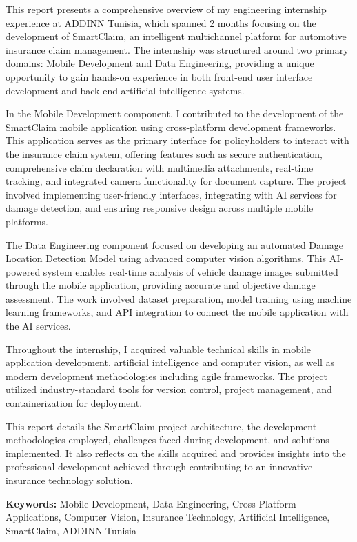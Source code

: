 \documentclass[12pt,a4paper]{report}
\begin{document}
This report presents a comprehensive overview of my engineering internship experience at ADDINN Tunisia, which spanned 2 months focusing on the development of SmartClaim, an intelligent multichannel platform for automotive insurance claim management. The internship was structured around two primary domains: Mobile Development and Data Engineering, providing a unique opportunity to gain hands-on experience in both front-end user interface development and back-end artificial intelligence systems.

In the Mobile Development component, I contributed to the development of the SmartClaim mobile application using cross-platform development frameworks. This application serves as the primary interface for policyholders to interact with the insurance claim system, offering features such as secure authentication, comprehensive claim declaration with multimedia attachments, real-time tracking, and integrated camera functionality for document capture. The project involved implementing user-friendly interfaces, integrating with AI services for damage detection, and ensuring responsive design across multiple mobile platforms.

The Data Engineering component focused on developing an automated Damage Location Detection Model using advanced computer vision algorithms. This AI-powered system enables real-time analysis of vehicle damage images submitted through the mobile application, providing accurate and objective damage assessment. The work involved dataset preparation, model training using machine learning frameworks, and API integration to connect the mobile application with the AI services.

Throughout the internship, I acquired valuable technical skills in mobile application development, artificial intelligence and computer vision, as well as modern development methodologies including agile frameworks. The project utilized industry-standard tools for version control, project management, and containerization for deployment.

This report details the SmartClaim project architecture, the development methodologies employed, challenges faced during development, and solutions implemented. It also reflects on the skills acquired and provides insights into the professional development achieved through contributing to an innovative insurance technology solution.

\textbf{Keywords:} Mobile Development, Data Engineering, Cross-Platform Applications, Computer Vision, Insurance Technology, Artificial Intelligence, SmartClaim, ADDINN Tunisia
\end{document}
